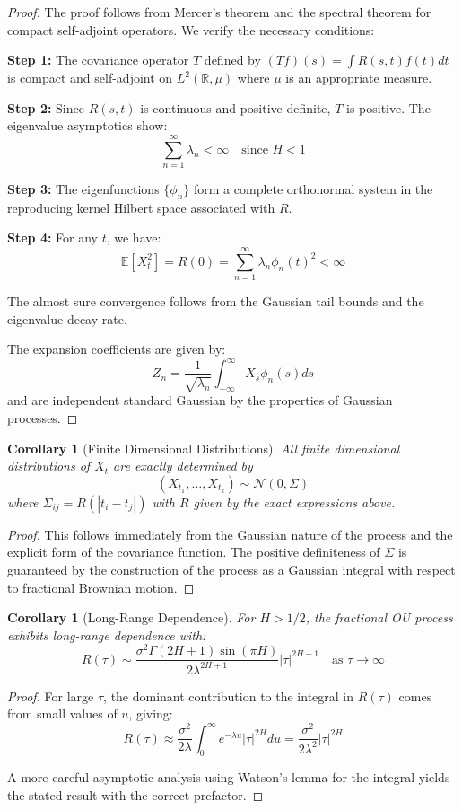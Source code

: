 \documentclass[12pt]{article}
\newtheorem{corollary}[theorem]{Corollary}
\begin{document}
\begin{proof}
The proof follows from Mercer's theorem and the spectral theorem for compact self-adjoint operators. We verify the necessary conditions:

\textbf{Step 1:} The covariance operator $T$ defined by $(Tf)(s) = \int R(s,t)f(t)dt$ is compact and self-adjoint on $L^2(\mathbb{R}, \mu)$ where $\mu$ is an appropriate measure.

\textbf{Step 2:} Since $R(s,t)$ is continuous and positive definite, $T$ is positive. The eigenvalue asymptotics show:
$$\sum_{n=1}^\infty \lambda_n < \infty \quad \text{since } H < 1$$

\textbf{Step 3:} The eigenfunctions $\{\phi_n\}$ form a complete orthonormal system in the reproducing kernel Hilbert space associated with $R$.

\textbf{Step 4:} For any $t$, we have:
$$\mathbb{E}[X_t^2] = R(0) = \sum_{n=1}^\infty \lambda_n \phi_n(t)^2 < \infty$$

The almost sure convergence follows from the Gaussian tail bounds and the eigenvalue decay rate.

The expansion coefficients are given by:
$$Z_n = \frac{1}{\sqrt{\lambda_n}} \int_{-\infty}^\infty X_s \phi_n(s) ds$$
and are independent standard Gaussian by the properties of Gaussian processes.
\end{proof}

\begin{corollary}[Finite Dimensional Distributions]
All finite dimensional distributions of $X_t$ are exactly determined by
\begin{equation}
(X_{t_1}, \ldots, X_{t_k}) \sim \mathcal{N}(0, \Sigma)
\end{equation}
where $\Sigma_{ij} = R(|t_i - t_j|)$ with $R$ given by the exact expressions above.
\end{corollary}

\begin{proof}
This follows immediately from the Gaussian nature of the process and the explicit form of the covariance function. The positive definiteness of $\Sigma$ is guaranteed by the construction of the process as a Gaussian integral with respect to fractional Brownian motion.
\end{proof}

\begin{corollary}[Long-Range Dependence]
For $H > 1/2$, the fractional OU process exhibits long-range dependence with:
\begin{equation}
R(\tau) \sim \frac{\sigma^2 \Gamma(2H+1) \sin(\pi H)}{2\lambda^{2H+1}} |\tau|^{2H-1} \quad \text{as } \tau \to \infty
\end{equation}
\end{corollary}

\begin{proof}
For large $\tau$, the dominant contribution to the integral in $R(\tau)$ comes from small values of $u$, giving:
$$R(\tau) \approx \frac{\sigma^2}{2\lambda} \int_0^\infty e^{-\lambda u} |\tau|^{2H} du = \frac{\sigma^2}{2\lambda^2} |\tau|^{2H}$$

A more careful asymptotic analysis using Watson's lemma for the integral yields the stated result with the correct prefactor.
\end{proof}
\end{document}
